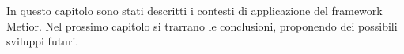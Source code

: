 In questo capitolo sono stati descritti i contesti di applicazione del framework Metior.
Nel prossimo capitolo si trarrano le conclusioni, proponendo dei possibili sviluppi futuri.
